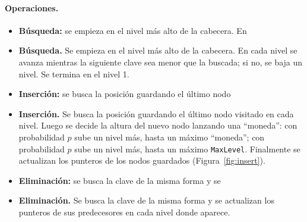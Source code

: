 \documentclass[11pt,a4paper]{article}
\begin{document}
\paragraph{Operaciones.}
\begin{itemize}
  \item \textbf{Búsqueda:} se empieza en el nivel más alto de la cabecera. En
  \item \textbf{Búsqueda.} Se empieza en el nivel más alto de la cabecera. En
  cada nivel se avanza mientras la siguiente clave sea menor que la buscada; si
  no, se baja un nivel. Se termina en el nivel 1.
  \item \textbf{Inserción:} se busca la posición guardando el último nodo
  \item \textbf{Inserción.} Se busca la posición guardando el último nodo
  visitado en cada nivel. Luego se decide la altura del nuevo nodo lanzando una
  ``moneda'': con probabilidad $p$ sube un nivel más, hasta un máximo
  ``moneda''; con probabilidad $p$ sube un nivel más, hasta un máximo
  \texttt{MaxLevel}. Finalmente se actualizan los punteros de los nodos
  guardados (Figura~\ref{fig:insert}).
  \item \textbf{Eliminación:} se busca la clave de la misma forma y se
  \item \textbf{Eliminación.} Se busca la clave de la misma forma y se
  actualizan los punteros de sus predecesores en cada nivel donde aparece.
\end{itemize}
\end{document}
